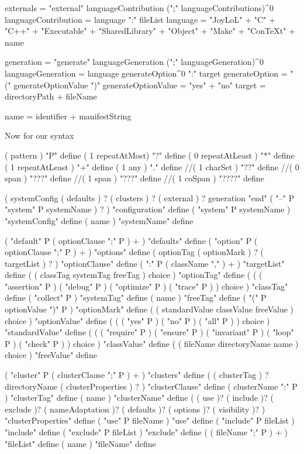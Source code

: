 externals = "external" languageContribution (";" languageContributions)^0
languageContribution = language ":" fileList
language = "JoyLoL" +
  "C" + "C++" +
  "Executable" + "SharedLibrary" + 
  "Object" +
  "Make" +
  "ConTeXt" +
  name

generation = "generate" languageGeneration (";" languageGeneration)^0
languageGeneration = language generateOption^0 ":" target
generateOption = "(" generateOptionValue ")"
generateOptionValue = "yes" + "no"
target = directoryPath + fileName

name = identifier + manifestString
\stoptyping

Now for our syntax

\startJoylolCode
( pattern ) "P" define
( 1 repeatAtMost) "?" define
( 0 repeatAtLeast ) "*" define
( 1 repeatAtLeast ) "+" define
( 1 any ) "." define
//( 1 charSet ) "??" define
//( 0 span ) "???" define
//( 1 span ) "???" define
//( 1 coSpan ) "????" define
\stopJoylolCode

\startJoylolCode
(
  systemConfig
  ( defaults ) ?
  ( clusters ) ?
  ( external ) ?
  generation
  "end" ( "--" P "system" P systemName ) ?
) "configuration" define
( "system" P systemName ) "systemConfig" define
( name ) "systemName" define

( "default" P ( optionClause ";" P ) + ) "defaults" define
( "option"  P ( optionClause ";" P ) + ) "options" define
( 
  optionTag 
  ( optionMark ) ? 
  ( targetList ) ?
) "optionClause" define
( ":" P ( className "," ) + ) "targetList" define
( ( classTag systemTag freeTag ) choice ) "optionTag" define
(
  ( 
    ( "assertion" P )
    ( "debug" P )
    ( "optimize" P )
    ( "trace" P )
  ) choice
) "classTag" define
( "collect" P ) "systemTag" define
( name ) "freeTag" define
( "(" P optionValue ")" P ) "optionMark" define
( ( standardValue classValue freeValue ) choice ) "optionValue" define
(
  ( 
    ( "yes" P )
    ( "no" P )
    ( "all" P )
  ) choice
) "standardValue" define
(
  ( 
    ( "require" P )
    ( "ensure" P )
    ( "invariant" P )
    ( "loop" P )
    ( "check" P )
  ) choice
) "classValue" define
( ( fileName directoryName name ) choice ) "freeValue" define

( "cluster" P ( clusterClause ";" P ) + ) "clusters" define
( 
  ( clusterTag ) ?
  directoryName 
  ( clusterProperties ) ?
) "clusterClause" define
( clusterName ":" P ) "clusterTag" define
( name ) "clusterName" define
(
  ( use )?
  ( include )?
  ( exclude )?
  ( nameAdaptation )?
  ( defaults )?
  ( options )?
  ( visibility )?
) "clusterProperties" define
( "use" P fileName ) "use" define
( "include" P fileList ) "include" define
( "exclude" P fileList ) "exclude" define
( ( fileName ";" P ) + ) "fileList" define
( name ) "fileName" define

